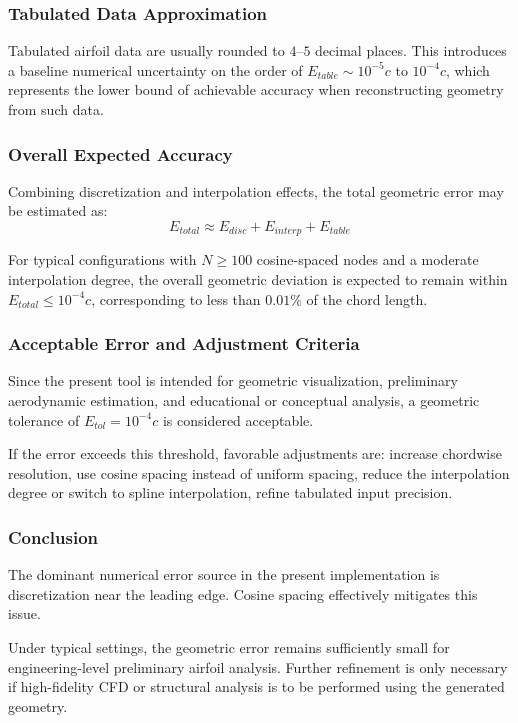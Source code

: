 
\subsubsection*{Tabulated Data Approximation}

Tabulated airfoil data are usually rounded to
$4$--$5$ decimal places.
This introduces a baseline numerical uncertainty
on the order of $E_{table} \sim 10^{-5}c \text{ to } 10^{-4}c$, which represents the lower bound of achievable accuracy
when reconstructing geometry from such data.


\subsubsection*{Overall Expected Accuracy}

Combining discretization and interpolation effects,
the total geometric error may be estimated as:
\[
E_{total} \approx
E_{disc} + E_{interp} + E_{table}
\]

For typical configurations with $N \geq 100$ cosine-spaced nodes and a moderate interpolation degree, 
the overall geometric deviation is expected to remain within $E_{total} \leq 10^{-4}c$, 
corresponding to less than $0.01\%$ of the chord length.


\subsubsection*{Acceptable Error and Adjustment Criteria}

Since the present tool is intended for geometric visualization,
preliminary aerodynamic estimation,
and educational or conceptual analysis,
a geometric tolerance of $E_{tol} = 10^{-4}c$
is considered acceptable.

If the error exceeds this threshold,
favorable adjustments are: 
increase chordwise resolution, 
use cosine spacing instead of uniform spacing, 
reduce the interpolation degree or switch to spline interpolation, 
refine tabulated input precision.


\subsubsection*{Conclusion}

The dominant numerical error source in the present implementation
is discretization near the leading edge.
Cosine spacing effectively mitigates this issue.

Under typical settings, the geometric error remains sufficiently small
for engineering-level preliminary airfoil analysis.
Further refinement is only necessary if high-fidelity CFD or structural analysis is to be performed using the generated geometry.